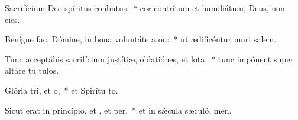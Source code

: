\item Sacrifícium Deo spíritus conbutus:~* cor contrítum et humiliátum, Deus, non cies.
\item Benígne fac, Dómine, in bona voluntáte a on:~* ut ædificéntur muri salem.
\item Tunc acceptábis sacrifícium justítiæ, oblatiónes, et lota:~* tunc impónent super altáre tu tulos.
\item Glória tri, et o,~* et Spirítu to.
\item Sicut erat in princípio, et , et per,~* et in sǽcula sæculó. men.
